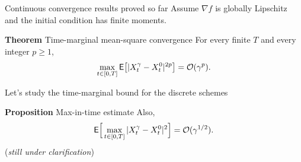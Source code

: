 \documentclass{beamer}
\newcommand{\<}{\langle}
\renewcommand{\>}{\rangle}
\begin{document}
\begin{frame}{Continuous convergence results proved so far}
    Assume $\nabla f$ is globally Lipschitz and the initial condition has finite moments.
    \bigskip
    \begin{block}{\textbf{Theorem} \textcolor{mygreen}{Time-marginal mean-square convergence}}
        For every finite $T$ and every integer $p\ge 1$,
        \[
        \max_{t\in[0,T]}{\mathsf E}\bigl[|X_t^\gamma-X_t^0|^{2p}\bigr]=\mathcal{O}(\gamma^p).
        \]
    \end{block}
    Let's study the \textcolor{mygreen}{time-marginal} bound for the discrete schemes
    \bigskip
    \begin{block}{\textbf{Proposition} Max-in-time estimate}
        Also,
        \[
        {\mathsf E}\Big[\max_{t\in[0,T]}|X_t^\gamma-X_t^0|^2\Big]=\mathcal{O}(\gamma^{1/2}).
        \]
        (\textit{still under clarification})
    \end{block}
\end{frame}
\end{document}
